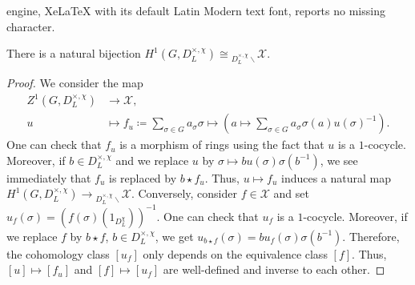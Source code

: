 \documentclass[10pt,a4paper]{amsart}
\def\Xcal{\mathcal{X}}
\newcommand{\bD}{D_L}
\begin{document}
engine, XeLaTeX with its default Latin Modern text font, reports no missing character.
\begin{lemma}\label{lemma: skew reps and H1}
There is a natural bijection \(H^1(G, \bD^{\times, \chi}) \cong {}_{\bD^{\times, \chi} \backslash} \Xcal\).
\end{lemma}

\begin{proof}
We consider the map
\begin{align*}
    Z^1(G, \bD^{\times, \chi}) & \longrightarrow \Xcal,\\
    u & \longmapsto f_u \coloneqq \sum_{\sigma \in G} a_\sigma \sigma \longmapsto \left( a \mapsto \sum_{\sigma \in G} a_\sigma \sigma(a) u(\sigma)^{-1}\right).
\end{align*}
One can check that \(f_u\) is a morphism of rings using the fact that \(u\) is a \(1\)-cocycle. 
Moreover, if \(b \in \bD^{\times, \chi}\) and we replace \(u\) by \(\sigma \mapsto bu(\sigma)\sigma(b^{-1})\), we see immediately that \(f_u\) is replaced by \(b \star f_u\). Thus, \(u \mapsto f_u\) induces a natural map \(H^1(G, \bD^{\times, \chi}) \to {}_{\bD^{\times, \chi} \backslash} \Xcal\). Conversely, consider \(f \in \Xcal\) and set \(u_f(\sigma) = (f(\sigma)(1_{\bD^\chi}))^{-1}\). 
One can check that \(u_f\) is a \(1\)-cocycle. Moreover, if we replace \(f\) by \(b\star f\), \(b \in \bD^{\times, \chi}\), we get \(u_{b \star f}(\sigma) = bu_f(\sigma)\sigma(b^{-1})\).
Therefore, the cohomology class \([u_f]\) only depends on the equivalence class \([f]\).
Thus, \([u] \mapsto [f_u]\) and \([f] \mapsto [u_f]\) are well-defined and inverse to each other.  
\end{proof}
\end{document}
